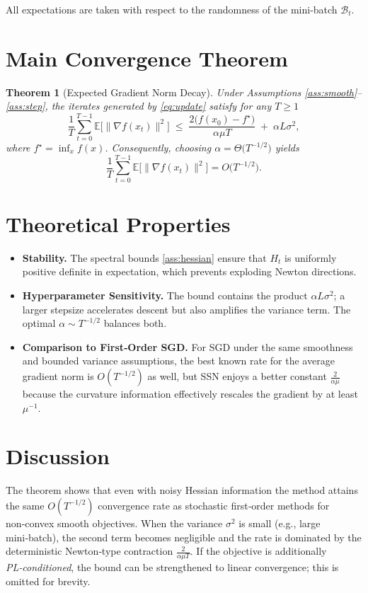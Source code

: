 \documentclass[11pt]{article}
\newtheorem{theorem}{Theorem}
\newcommand{\E}{\mathbb{E}}
\begin{document}
All expectations are taken with respect to the randomness of the mini‑batch
$\mathcal{B}_{t}$.

\section*{Main Convergence Theorem}
\begin{theorem}[Expected Gradient Norm Decay]\label{thm:main}
Under Assumptions \ref{ass:smooth}–\ref{ass:step}, the iterates generated by
\eqref{eq:update} satisfy for any $T\ge 1$
\[
\frac{1}{T}\sum_{t=0}^{T-1}\E\big[\|\nabla f(x_{t})\|^{2}\big]
\;\le\;
\frac{2\big(f(x_{0})-f^{\star}\big)}{\alpha\mu T}
\;+\;
\alpha L\sigma^{2},
\]
where $f^{\star}= \inf_{x}f(x)$.
Consequently, choosing $\alpha =\Theta\!\big(T^{-1/2}\big)$ yields
\[
\frac{1}{T}\sum_{t=0}^{T-1}\E\big[\|\nabla f(x_{t})\|^{2}\big]=O\!\big(T^{-1/2}\big).
\]
\end{theorem}

\section*{Theoretical Properties}
\begin{itemize}
\item \textbf{Stability.} The spectral bounds \eqref{ass:hessian} ensure that
$H_{t}$ is uniformly positive definite in expectation, which prevents
exploding Newton directions.
\item \textbf{Hyperparameter Sensitivity.} The bound contains the product
$\alpha L\sigma^{2}$; a larger stepsize accelerates descent but also amplifies
the variance term. The optimal $\alpha\sim T^{-1/2}$ balances both.
\item \textbf{Comparison to First‑Order SGD.}
For SGD under the same smoothness and bounded variance assumptions,
the best known rate for the average gradient norm is $O(T^{-1/2})$ as well,
but SSN enjoys a better constant $\frac{2}{\alpha\mu}$ because the curvature
information effectively rescales the gradient by at least $\mu^{-1}$.
\end{itemize}

\section*{Discussion}
The theorem shows that even with noisy Hessian information the method attains
the same $O(T^{-1/2})$ convergence rate as stochastic first‑order methods for
non‑convex smooth objectives.  When the variance $\sigma^{2}$ is small (e.g.,
large mini‑batch), the second term becomes negligible and the rate is
dominated by the deterministic Newton‑type contraction $\frac{2}{\alpha\mu T}$.
If the objective is additionally \emph{PL‑conditioned}, the bound can be
strengthened to linear convergence; this is omitted for brevity.
\end{document}

